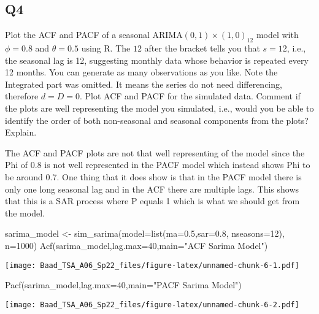 \documentclass[
]{article}
\newenvironment{Shaded}{\begin{snugshade}}{\end{snugshade}}
\newcommand{\AttributeTok}[1]{\textcolor[rgb]{0.77,0.63,0.00}{#1}}
\newcommand{\DecValTok}[1]{\textcolor[rgb]{0.00,0.00,0.81}{#1}}
\newcommand{\FloatTok}[1]{\textcolor[rgb]{0.00,0.00,0.81}{#1}}
\newcommand{\FunctionTok}[1]{\textcolor[rgb]{0.00,0.00,0.00}{#1}}
\newcommand{\NormalTok}[1]{#1}
\newcommand{\OtherTok}[1]{\textcolor[rgb]{0.56,0.35,0.01}{#1}}
\newcommand{\StringTok}[1]{\textcolor[rgb]{0.31,0.60,0.02}{#1}}
\begin{document}
\hypertarget{q4}{%
\subsection{Q4}\label{q4}}

Plot the ACF and PACF of a seasonal ARIMA\((0, 1)\times(1, 0)_{12}\)
model with \(\phi =0 .8\) and \(\theta = 0.5\) using R. The \(12\) after
the bracket tells you that \(s=12\), i.e., the seasonal lag is 12,
suggesting monthly data whose behavior is repeated every 12 months. You
can generate as many observations as you like. Note the Integrated part
was omitted. It means the series do not need differencing, therefore
\(d=D=0\). Plot ACF and PACF for the simulated data. Comment if the
plots are well representing the model you simulated, i.e., would you be
able to identify the order of both non-seasonal and seasonal components
from the plots? Explain.

The ACF and PACF plots are not that well representing of the model since
the Phi of 0.8 is not well represented in the PACF model which instead
shows Phi to be around 0.7. One thing that it does show is that in the
PACF model there is only one long seasonal lag and in the ACF there are
multiple lags. This shows that this is a SAR process where P equals 1
which is what we should get from the model.

\begin{Shaded}
\begin{Highlighting}[]
\NormalTok{sarima\_model }\OtherTok{\textless{}{-}} \FunctionTok{sim\_sarima}\NormalTok{(}\AttributeTok{model=}\FunctionTok{list}\NormalTok{(}\AttributeTok{ma=}\FloatTok{0.5}\NormalTok{,}\AttributeTok{sar=}\FloatTok{0.8}\NormalTok{, }\AttributeTok{nseasons=}\DecValTok{12}\NormalTok{), }\AttributeTok{n=}\DecValTok{1000}\NormalTok{)}
\FunctionTok{Acf}\NormalTok{(sarima\_model,}\AttributeTok{lag.max=}\DecValTok{40}\NormalTok{,}\AttributeTok{main=}\StringTok{"ACF Sarima Model"}\NormalTok{)}
\end{Highlighting}
\end{Shaded}

\texttt{[image: Baad\_TSA\_A06\_Sp22\_files/figure-latex/unnamed-chunk-6-1.pdf]}

\begin{Shaded}
\begin{Highlighting}[]
\FunctionTok{Pacf}\NormalTok{(sarima\_model,}\AttributeTok{lag.max=}\DecValTok{40}\NormalTok{,}\AttributeTok{main=}\StringTok{"PACF Sarima Model"}\NormalTok{)}
\end{Highlighting}
\end{Shaded}

\texttt{[image: Baad\_TSA\_A06\_Sp22\_files/figure-latex/unnamed-chunk-6-2.pdf]}
\end{document}
